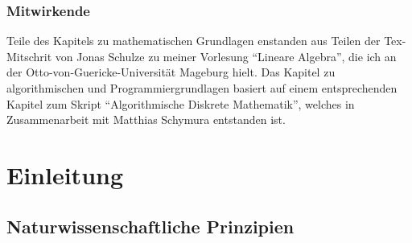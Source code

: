 


\subsection*{Mitwirkende}

Teile des Kapitels zu mathematischen Grundlagen enstanden aus Teilen der Tex-Mitschrit von Jonas Schulze zu meiner Vorlesung ``Lineare Algebra'', die ich an der Otto-von-Guericke-Universität Mageburg hielt. Das Kapitel zu algorithmischen und Programmiergrundlagen basiert auf einem entsprechenden Kapitel zum Skript ``Algorithmische Diskrete Mathematik'', welches in Zusammenarbeit mit Matthias Schymura entstanden ist. 

\chapter*{Einleitung}

\section{Naturwissenschaftliche Prinzipien}

